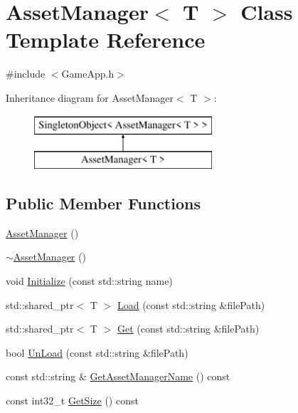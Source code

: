 \hypertarget{class_asset_manager}{}\section{Asset\+Manager$<$ T $>$ Class Template Reference}
\label{class_asset_manager}


{\ttfamily \#include $<$Game\+App.\+h$>$}

Inheritance diagram for Asset\+Manager$<$ T $>$\+:\begin{figure}[H]
\begin{center}
\leavevmode
\includegraphics[height=2.000000cm]{class_asset_manager}
\end{center}
\end{figure}
\subsection*{Public Member Functions}
\begin{DoxyCompactItemize}
\item 
\mbox{\hyperlink{class_asset_manager_a17362b22d791f64a200bfeaffa9b5108}{Asset\+Manager}} ()
\item 
\mbox{\hyperlink{class_asset_manager_a99de467c293ead8517bbfd5672b40b0d}{$\sim$\+Asset\+Manager}} ()
\item 
void \mbox{\hyperlink{class_asset_manager_ace92285c403c555e8e6fdb258e9e57d0}{Initialize}} (const std\+::string name)
\item 
std\+::shared\+\_\+ptr$<$ T $>$ \mbox{\hyperlink{class_asset_manager_ad685ea526834b044a13fe07e630bfe0a}{Load}} (const std\+::string \&file\+Path)
\item 
std\+::shared\+\_\+ptr$<$ T $>$ \mbox{\hyperlink{class_asset_manager_a28d1324d3a691d83e4395661702dc9eb}{Get}} (const std\+::string \&file\+Path)
\item 
bool \mbox{\hyperlink{class_asset_manager_a5b015e693d11b39ee98a094ef9d74966}{Un\+Load}} (const std\+::string \&file\+Path)
\item 
const std\+::string \& \mbox{\hyperlink{class_asset_manager_a7c1faafe83a1dbbd1ae463f1de7b6476}{Get\+Asset\+Manager\+Name}} () const
\item 
const int32\+\_\+t \mbox{\hyperlink{class_asset_manager_a329526176de822f96a6b4fb1cb30ce20}{Get\+Size}} () const
\end{DoxyCompactItemize}
